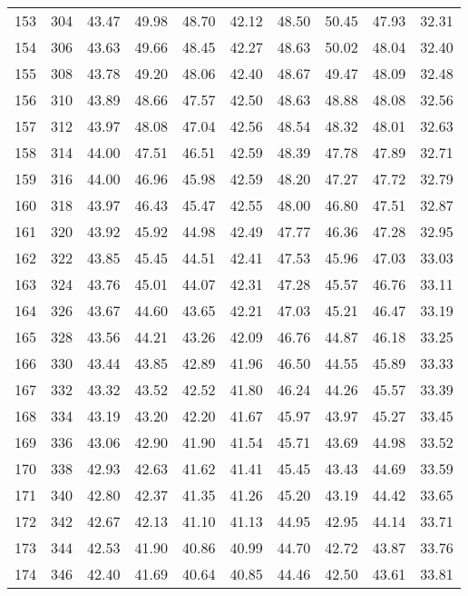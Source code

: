 \begin{longtable}{rrllllllll}
		153 & 304 & 43.47 & 49.98 & 48.70 & 42.12 & 48.50 & 50.45 & 47.93 & 32.31 \\ 
		154 & 306 & 43.63 & 49.66 & 48.45 & 42.27 & 48.63 & 50.02 & 48.04 & 32.40 \\ 
		155 & 308 & 43.78 & 49.20 & 48.06 & 42.40 & 48.67 & 49.47 & 48.09 & 32.48 \\ 
		156 & 310 & 43.89 & 48.66 & 47.57 & 42.50 & 48.63 & 48.88 & 48.08 & 32.56 \\ 
		157 & 312 & 43.97 & 48.08 & 47.04 & 42.56 & 48.54 & 48.32 & 48.01 & 32.63 \\ 
		158 & 314 & 44.00 & 47.51 & 46.51 & 42.59 & 48.39 & 47.78 & 47.89 & 32.71 \\ 
		159 & 316 & 44.00 & 46.96 & 45.98 & 42.59 & 48.20 & 47.27 & 47.72 & 32.79 \\ 
		160 & 318 & 43.97 & 46.43 & 45.47 & 42.55 & 48.00 & 46.80 & 47.51 & 32.87 \\ 
		161 & 320 & 43.92 & 45.92 & 44.98 & 42.49 & 47.77 & 46.36 & 47.28 & 32.95 \\ 
		162 & 322 & 43.85 & 45.45 & 44.51 & 42.41 & 47.53 & 45.96 & 47.03 & 33.03 \\ 
		163 & 324 & 43.76 & 45.01 & 44.07 & 42.31 & 47.28 & 45.57 & 46.76 & 33.11 \\ 
		164 & 326 & 43.67 & 44.60 & 43.65 & 42.21 & 47.03 & 45.21 & 46.47 & 33.19 \\ 
		165 & 328 & 43.56 & 44.21 & 43.26 & 42.09 & 46.76 & 44.87 & 46.18 & 33.25 \\ 
		166 & 330 & 43.44 & 43.85 & 42.89 & 41.96 & 46.50 & 44.55 & 45.89 & 33.33 \\ 
		167 & 332 & 43.32 & 43.52 & 42.52 & 41.80 & 46.24 & 44.26 & 45.57 & 33.39 \\ 
		168 & 334 & 43.19 & 43.20 & 42.20 & 41.67 & 45.97 & 43.97 & 45.27 & 33.45 \\ 
		169 & 336 & 43.06 & 42.90 & 41.90 & 41.54 & 45.71 & 43.69 & 44.98 & 33.52 \\ 
		170 & 338 & 42.93 & 42.63 & 41.62 & 41.41 & 45.45 & 43.43 & 44.69 & 33.59 \\ 
		171 & 340 & 42.80 & 42.37 & 41.35 & 41.26 & 45.20 & 43.19 & 44.42 & 33.65 \\ 
		172 & 342 & 42.67 & 42.13 & 41.10 & 41.13 & 44.95 & 42.95 & 44.14 & 33.71 \\ 
		173 & 344 & 42.53 & 41.90 & 40.86 & 40.99 & 44.70 & 42.72 & 43.87 & 33.76 \\ 
		174 & 346 & 42.40 & 41.69 & 40.64 & 40.85 & 44.46 & 42.50 & 43.61 & 33.81 \\ 

\end{longtable}
